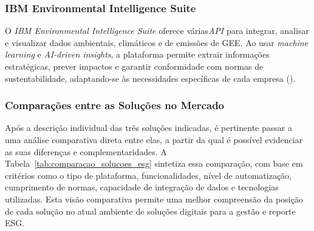 \subsubsection{IBM Environmental Intelligence Suite}

O \textit{IBM Environmental Intelligence Suite} oferece várias\textit{\gls{API}} para integrar, analisar e visualizar dados ambientais, climáticos e de emissões de \gls{GEE}. Ao usar \textit{machine learning} e \textit{AI-driven insights}, a plataforma permite extrair informações estratégicas, prever impactos e garantir conformidade com normas de sustentabilidade, adaptando-se às necessidades específicas de cada empresa (\cite{IBM2025}).

\subsubsection{Comparações entre as Soluções no Mercado}

Após a descrição individual das três soluções indicadas, é pertinente passar a uma análise comparativa direta entre elas, a partir da qual é possível evidenciar as suas diferenças e complementaridades. A Tabela~\ref{tab:comparacao_solucoes_esg} sintetiza essa comparação, com base em critérios como o tipo de plataforma, funcionalidades, nível de automatização, cumprimento de normas, capacidade de integração de dados e tecnologias utilizadas. Esta visão comparativa permite uma melhor compreensão da posição de cada solução no atual ambiente de soluções digitais para a gestão e reporte ESG.

